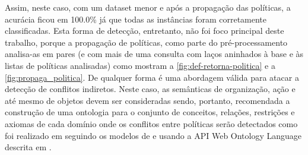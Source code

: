 Assim, neste caso, com um dataset menor e após a propagação das políticas, a acurácia ficou em 100.0\% já que todas as instâncias foram corretamente classificadas. Esta forma de detecção, entretanto, não foi foco principal deste trabalho, porque a propagação de políticas, como parte do pré-processamento analisa-as em pares (e com mais de uma consulta com laços aninhados à base e às listas de políticas analisadas) como mostram a \autoref{fig:def-retorna-politica} e a \autoref{fig:propaga_politica}. %
 De qualquer forma é uma abordagem  válida para atacar a detecção de conflitos indiretos. Neste caso, as semânticas de organização, ação e até mesmo de objetos devem ser consideradas sendo, portanto, recomendada a construção de uma ontologia para o conjunto de conceitos, relações, restrições e axiomas de cada domínio onde os conflitos entre políticas serão detectados como foi realizado em  seguindo os modelos de  e usando a API Web Ontology Language descrita em .


